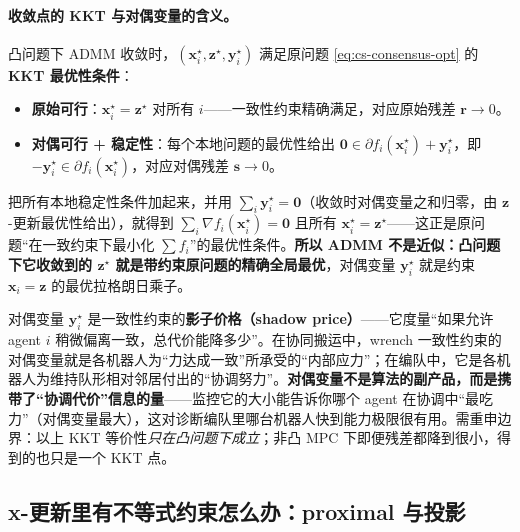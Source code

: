 \paragraph{收敛点的 KKT 与对偶变量的含义。}
凸问题下 ADMM 收敛时，$(\mathbf{x}_i^\star,\mathbf{z}^\star,\mathbf{y}_i^\star)$ 满足原问题 \cref{eq:cs-consensus-opt} 的 \textbf{KKT 最优性条件}：
\begin{itemize}
  \item \textbf{原始可行}：$\mathbf{x}_i^\star=\mathbf{z}^\star$ 对所有 $i$——一致性约束精确满足，对应原始残差 $\mathbf{r}\to0$。
  \item \textbf{对偶可行 + 稳定性}：每个本地问题的最优性给出 $\mathbf{0}\in\partial f_i(\mathbf{x}_i^\star)+\mathbf{y}_i^\star$，即 $-\mathbf{y}_i^\star\in\partial f_i(\mathbf{x}_i^\star)$，对应对偶残差 $\mathbf{s}\to0$。
\end{itemize}
把所有本地稳定性条件加起来，并用 $\sum_i\mathbf{y}_i^\star=\mathbf{0}$（收敛时对偶变量之和归零，由 $\mathbf{z}$-更新最优性给出），就得到 $\sum_i\nabla f_i(\mathbf{x}_i^\star)=\mathbf{0}$ 且所有 $\mathbf{x}_i^\star=\mathbf{z}^\star$——这正是原问题“在一致约束下最小化 $\sum f_i$”的最优性条件。\textbf{所以 ADMM 不是近似：凸问题下它收敛到的 $\mathbf{z}^\star$ 就是带约束原问题的精确全局最优}，对偶变量 $\mathbf{y}_i^\star$ 就是约束 $\mathbf{x}_i=\mathbf{z}$ 的最优拉格朗日乘子。

\begin{insight}[对偶变量是一致性约束的影子价格]\label{ins:cs-shadow-price}
对偶变量 $\mathbf{y}_i^\star$ 是一致性约束的\textbf{影子价格（shadow price）}——它度量“如果允许 agent $i$ 稍微偏离一致，总代价能降多少”。在协同搬运中，wrench 一致性约束的对偶变量就是各机器人为“力达成一致”所承受的“内部应力”；在编队中，它是各机器人为维持队形相对邻居付出的“协调努力”。\textbf{对偶变量不是算法的副产品，而是携带了“协调代价”信息的量}——监控它的大小能告诉你哪个 agent 在协调中“最吃力”（对偶变量最大），这对诊断编队里哪台机器人快到能力极限很有用。需重申边界：以上 KKT 等价性\emph{只在凸问题下成立}；非凸 MPC 下即便残差都降到很小，得到的也只是一个 KKT 点。
\end{insight}

\subsection{x-更新里有不等式约束怎么办：proximal 与投影}
\label{sec:cs-admm-prox}

